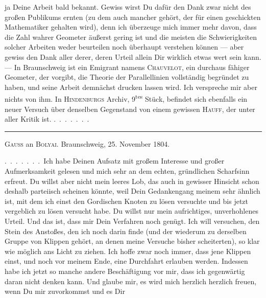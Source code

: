ja Deine Arbeit bald bekannt. Gewiss wirst Du dafür den Dank zwar nicht
des großen Publikums ernten (zu dem auch mancher gehört, der für einen
geschickten Mathematiker gehalten wird), denn ich überzeuge
mich immer mehr davon, dass die Zahl wahrer Geometer äußerst gering ist und
die meisten die Schwierigkeiten solcher Arbeiten weder beurteilen
noch überhaupt verstehen können --- aber gewiss den Dank aller
derer, deren Urteil allein Dir wirklich etwas wert sein kann. --- In
Braunschweig ist ein Emigrant namens \textsc{Chauvelot}, ein
durchaus fähiger Geometer, der vorgibt, die Theorie der Parallellinien
vollständig begründet zu haben, und seine Arbeit demnächst drucken
lassen wird. Ich verspreche mir aber nichts von ihm. In
\textsc{Hindenburgs} Archiv, 9\textsuperscript{tes} Stück, befindet
sich ebenfalls ein neuer Versuch über denselben Gegenstand von
einem gewissen \textsc{Hauff}, der unter aller Kritik ist. .\, .\, .\, .\, .\, .\, .

\medskip
\begin{center}
\rule{0.3\textwidth}{0.4pt}
\end{center}
\medskip

\begin{center}
\textsc{Gauss} an \textsc{Bolyai}. Braunschweig, 25. November 1804.
\end{center}

.\, .\, .\, .\, .\, .\, .\ Ich habe Deinen Aufsatz mit großem Interesse und
großer Aufmerksamkeit gelesen und mich sehr an dem echten, gründlichen
Scharfsinn erfreut. Du willst aber nicht mein leeres Lob, das auch
in gewisser Hinsicht schon deshalb parteiisch scheinen könnte, weil Dein
Gedankengang meinem sehr ähnlich ist, mit dem ich
einst den Gordischen Knoten zu lösen versuchte und bis jetzt vergeblich
zu lösen versucht habe. Du willst nur mein aufrichtiges, unverhohlenes
Urteil. Und das ist, dass mir Dein Verfahren noch
genügt. Ich will versuchen, den Stein des Anstoßes, den ich
noch darin finde (und der wiederum zu derselben Gruppe von Klippen
gehört, an denen meine Versuche bisher scheiterten), so klar
wie möglich ans Licht zu ziehen. Ich hoffe zwar noch
immer, dass jene Klippen einst, und noch vor meinem
Ende, eine Durchfahrt erlauben werden. Indessen habe ich jetzt so
manche andere Beschäftigung vor mir, dass ich gegenwärtig
daran nicht denken kann. Und glaube mir, es wird mich herzlich
herzlich freuen, wenn Du mir zuvorkommst und es Dir
